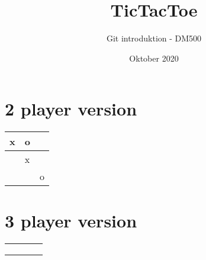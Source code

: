 \documentclass[20pt]{article}
\title{TicTacToe}
\author{Git introduktion - DM500}
\date{Oktober 2020}
\begin{document}
\maketitle

\section*{2 player version}

\setlength{\tabcolsep}{20pt}
\renewcommand{\arraystretch}{4}

\begin{table}[h]
\Large
    \centering
\begin{tabular}{ |m{2cm}|m{2cm}|m{2cm}|}
\hline

 x & o &   \\ \hline
  & x &   \\ \hline
  &   & o \\ \hline
\end{tabular}

\end{table}

\newpage

\section*{3 player version}

\setlength{\tabcolsep}{14pt}
\renewcommand{\arraystretch}{5}

\begin{table}[h]
\large
    \centering
\begin{tabular}{ |m{2cm}|m{2cm}|m{2cm}|m{2cm}|}
\hline
  &   &   &   \\ \hline
  &   &   &   \\ \hline
  &   &   &   \\ \hline
  &   &   &   \\ \hline

\end{tabular}

\end{table}
\end{document}
